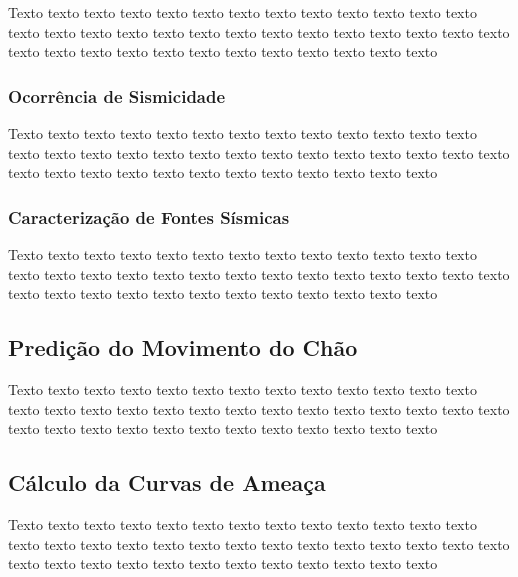 Texto texto texto texto texto texto texto texto texto texto texto texto texto
texto texto texto texto texto texto texto texto texto texto texto texto texto
texto texto texto texto texto texto texto texto texto texto texto texto texto


\subsubsection{Ocorrência de Sismicidade}
\label{sec:fontes}




Texto texto texto texto texto texto texto texto texto texto texto texto texto
texto texto texto texto texto texto texto texto texto texto texto texto texto
texto texto texto texto texto texto texto texto texto texto texto texto texto



\subsubsection{Caracterização de Fontes Sísmicas}
\label{sec:fontes}



Texto texto texto texto texto texto texto texto texto texto texto texto texto
texto texto texto texto texto texto texto texto texto texto texto texto texto
texto texto texto texto texto texto texto texto texto texto texto texto texto





\subsection{Predição do Movimento do Chão} 
\label{sec:gmpe}


Texto texto texto texto texto texto texto texto texto texto texto texto texto
texto texto texto texto texto texto texto texto texto texto texto texto texto
texto texto texto texto texto texto texto texto texto texto texto texto texto



\subsection{Cálculo da Curvas de Ameaça} 
\label{sec:curvas_de_ameaca}


Texto texto texto texto texto texto texto texto texto texto texto texto texto
texto texto texto texto texto texto texto texto texto texto texto texto texto
texto texto texto texto texto texto texto texto texto texto texto texto texto

